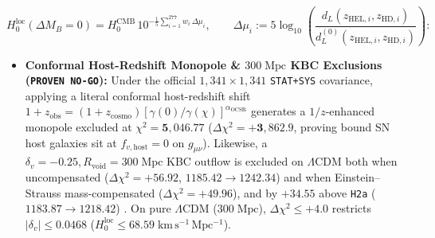\documentclass[11pt,a4paper]{article}
\begin{document}
\begin{equation}
  H_0^{\mathrm{loc}}(\Delta M_B = 0) = H_0^{\mathrm{CMB}}\,10^{-\frac{1}{5}\sum_{i=1}^{277} w_i\,\Delta\mu_i}, \qquad \Delta\mu_i := 5\log_{10}\!\left(\frac{d_L(z_{\mathrm{HEL},i}, z_{\mathrm{HD},i})}{d_L^{(0)}(z_{\mathrm{HEL},i}, z_{\mathrm{HD},i})}\right):
\label{eq:windowed-h0}
\end{equation}
\begin{itemize}
  \item \textbf{Conformal Host-Redshift Monopole \& $300\;\mathrm{Mpc}$ KBC Exclusions ({\upshape\texttt{PROVEN NO-GO}}):} Under the official $1{,}341\times 1{,}341$ \texttt{STAT+SYS} covariance, applying a literal conformal host-redshift shift $1 + z_{\mathrm{obs}} = (1 + z_{\mathrm{cosmo}})[\gamma(0)/\gamma(\chi)]^{\alpha_{\mathrm{OCSR}}}$ generates a $1/z$-enhanced monopole excluded at $\chi^2 = \mathbf{5{,}046.77}$ ($\Delta\chi^2 = \mathbf{+3{,}862.9}$, proving bound SN host galaxies sit at $f_{v,\mathrm{host}} = 0$ on $g_{\mu\nu}$). Likewise, a $\delta_v = -0.25, R_{\mathrm{void}} = 300\;\mathrm{Mpc}$ KBC outflow \cite{Keenan2013KBC,Haslbauer2020KBC} is excluded on $\Lambda$CDM both when uncompensated ($\Delta\chi^2 = \mathbf{+56.92}$, $1185.42 \to 1242.34$) and when Einstein--Strauss mass-compensated ($\Delta\chi^2 = \mathbf{+49.96}$), and by $+34.55$ above \texttt{H2a} ($1183.87 \to 1218.42$) \cite{Kenworthy2019LocalVoid}. On pure $\Lambda$CDM ($300\;\mathrm{Mpc}$), $\Delta\chi^2 \le +4.0$ restricts $|\delta_v| \le 0.0468$ ($H_0^{\mathrm{loc}} \le 68.59\;\mathrm{km\,s^{-1}\,Mpc^{-1}}$).

\end{itemize}
\end{document}
